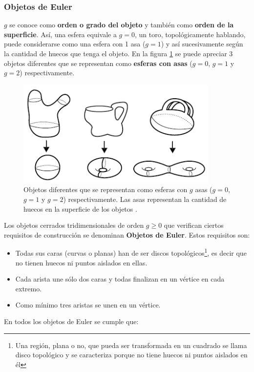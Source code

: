 \subsubsection{ Objetos de Euler }
 $g$ se conoce como \textbf{orden o grado del objeto} y también como \textbf{orden de la superficie}. Así, una esfera equivale a $g = 0 $, un toro, topológicamente hablando, puede considerarse como una esfera con 1 asa ($g = 1$) y así sucesivamente según la cantidad de huecos que tenga el objeto. En la figura \ref{fig:asas} se puede apreciar 3 objetos diferentes que se representan como \textbf{esferas con asas} ($g = 0$, $g = 1$ y $g = 2$) respectivamente.
 
   \begin{figure}[ht]
    \includegraphics[width=10cm]{Img/GEO/geo-asas.png}
    \centering
    \caption{\footnotesize{Objetos diferentes que se representan como esferas con $g$ asas ($g = 0$, $g = 1$ y $g = 2$) respectivamente. Las asas representan la cantidad de huecos en la superficie de los objetos  \citep{Annenberg}.}}
    \label{fig:asas}
    \end{figure}
 
 Los objetos cerrados tridimensionales de orden $g \geq 0 $ que verifican ciertos requisitos de construcción se denominan \textbf{Objetos de Euler}. Estos requisitos son:
\begin{itemize}
\item Todas sus caras (curvas o planas) han de ser discos topológicos\footnote{Una región, plana o no, que pueda ser transformada en un cuadrado se llama disco topológico y se caracteriza porque no tiene huecos ni puntos aislados en él}, es decir que no tienen huecos ni puntos aislados en ellas. 
\item Cada arista une sólo dos caras y todas finalizan en un vértice en
cada extremo.
\item Como mínimo tres aristas se unen en un vértice. 
\end{itemize}

En todos los objetos de Euler se cumple que:



